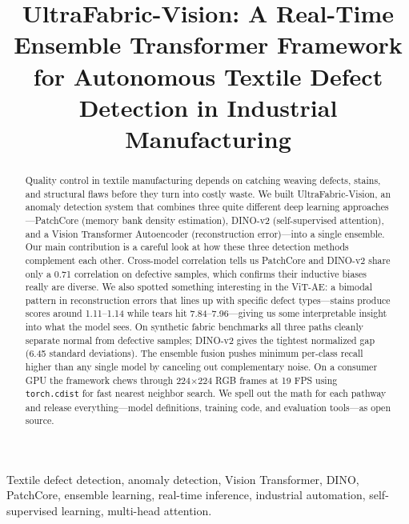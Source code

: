 \documentclass[journal]{IEEEtran}
\begin{document}
\title{UltraFabric-Vision: A Real-Time Ensemble Transformer Framework for Autonomous Textile Defect Detection in Industrial Manufacturing}

\author{
}

\maketitle

\begin{abstract}
Quality control in textile manufacturing depends on catching weaving defects, stains, and structural flaws before they turn into costly waste. We built UltraFabric-Vision, an anomaly detection system that combines three quite different deep learning approaches---PatchCore (memory bank density estimation), DINO-v2 (self-supervised attention), and a Vision Transformer Autoencoder (reconstruction error)---into a single ensemble. Our main contribution is a careful look at how these three detection methods complement each other. Cross-model correlation tells us PatchCore and DINO-v2 share only a 0.71 correlation on defective samples, which confirms their inductive biases really are diverse. We also spotted something interesting in the ViT-AE: a bimodal pattern in reconstruction errors that lines up with specific defect types---stains produce scores around 1.11--1.14 while tears hit 7.84--7.96---giving us some interpretable insight into what the model sees. On synthetic fabric benchmarks all three paths cleanly separate normal from defective samples; DINO-v2 gives the tightest normalized gap (6.45 standard deviations). The ensemble fusion pushes minimum per-class recall higher than any single model by canceling out complementary noise. On a consumer GPU the framework chews through 224$\times$224 RGB frames at 19 FPS using \texttt{torch.cdist} for fast nearest neighbor search. We spell out the math for each pathway and release everything---model definitions, training code, and evaluation tools---as open source.
\end{abstract}

\begin{IEEEkeywords}
Textile defect detection, anomaly detection, Vision Transformer, DINO, PatchCore, ensemble learning, real-time inference, industrial automation, self-supervised learning, multi-head attention.
\end{IEEEkeywords}
\end{document}
